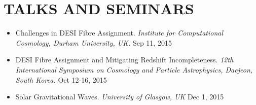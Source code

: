 \section{TALKS AND SEMINARS}
\begin{itemize}

\item Challenges in DESI Fibre Assignment. {\sl Institute for Computational Cosmology, Durham University, UK.} \hfill Sep 11, 2015
\item DESI Fibre Assignment and Mitigating Redshift Incompleteness. {\sl 12th International Symposium on Cosmology and Particle Astrophysics, Daejeon, South Korea.} \hfill \hfill Oct 12-16, 2015
\item Solar Gravitational Waves. {\sl University of Glasgow, UK} \hfill Dec 1, 2015
\end{itemize}